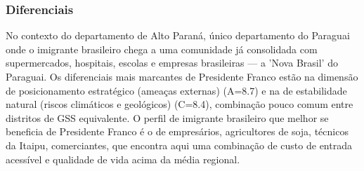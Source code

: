 \subsubsection*{Diferenciais}\label{dif-presidente-franco-1002}
No contexto do departamento de Alto Paraná, único departamento do Paraguai onde o imigrante brasileiro chega a uma comunidade já consolidada com supermercados, hospitais, escolas e empresas brasileiras — a 'Nova Brasil' do Paraguai. Os diferenciais mais marcantes de Presidente Franco estão na dimensão de posicionamento estratégico (ameaças externas) (A=8.7) e na de estabilidade natural (riscos climáticos e geológicos) (C=8.4), combinação pouco comum entre distritos de GSS equivalente. O perfil de imigrante brasileiro que melhor se beneficia de Presidente Franco é o de empresários, agricultores de soja, técnicos da Itaipu, comerciantes, que encontra aqui uma combinação de custo de entrada acessível e qualidade de vida acima da média regional.
